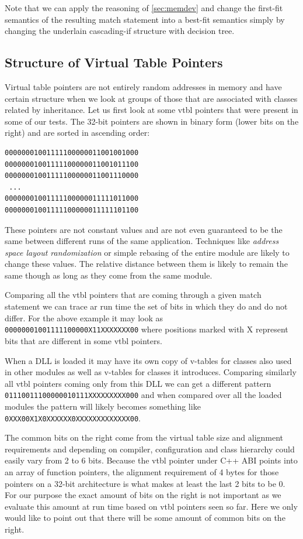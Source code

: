 \documentclass[preprint]{sigplanconf}
\begin{document}
Note that we can apply the reasoning of \textsection\ref{sec:memdev} and change 
the first-fit semantics of the resulting match statement into a best-fit 
semantics simply by changing the underlain cascading-if structure with decision 
tree.

\subsection{Structure of Virtual Table Pointers}
\label{sec:sovtp}

Virtual table pointers are not entirely random addresses in memory and have 
certain structure when we look at groups of those that are associated with 
classes related by inheritance. Let us first look at some vtbl pointers that 
were present in some of our tests. The 32-bit pointers are shown in binary form 
(lower bits on the right) and are sorted in ascending order:

\begin{verbatim}
00000001001111100000011001001000
00000001001111100000011001011100
00000001001111100000011001110000
 ...
00000001001111100000011111011000
00000001001111100000011111101100
\end{verbatim}

These pointers are not constant values and are not even guaranteed to be the 
same between different runs of the same application. Techniques like 
\emph{address space layout randomization} or simple rebasing of the entire 
module are likely to change these values. The relative distance between them is 
likely to remain the same though as long as they come from the same module.

Comparing all the vtbl pointers that are coming through a given match statement 
we can trace ar run time the set of bits in which they do and do not differ. 
For the above example it may look as \texttt{00000001001111100000X11XXXXXXX00} 
where positions marked with X represent bits that are different in some vtbl 
pointers.

When a DLL is loaded it may have its own copy of v-tables for classes also used 
in other modules as well as v-tables for classes it introduces. Comparing 
similarly all vtbl pointers coming only from this DLL we can get a different 
pattern \\ \texttt{01110011100000010111XXXXXXXXX000} and when compared over all 
the loaded modules the pattern will likely becomes something like 
\texttt{0XXX00X1X0XXXXXX0XXXXXXXXXXXXX00}.

The common bits on the right come from the virtual table size and alignment 
requirements and depending on compiler, configuration and class hierarchy could 
easily vary from 2 to 6 bits. Because the vtbl pointer under C++ ABI points into 
an array of function pointers, the alignment requirement of 4 bytes for those 
pointers on a 32-bit architecture is what makes at least the last 2 bits to be 0. 
For our purpose the exact amount of bits on the right is not important as we 
evaluate this amount at run time based on vtbl pointers seen so far. Here we only 
would like to point out that there will be some amount of common bits on the 
right.
\end{document}
